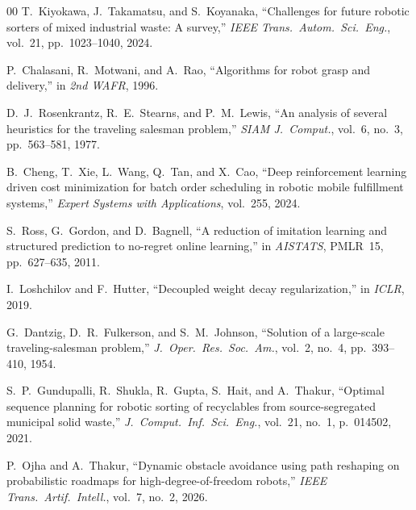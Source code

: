 \documentclass[conference]{IEEEtran}
\begin{document}
\begin{thebibliography}{00}
 T.~Kiyokawa, J.~Takamatsu, and S.~Koyanaka, ``Challenges for future robotic sorters of mixed industrial waste: A survey,'' \emph{IEEE Trans.\ Autom.\ Sci.\ Eng.}, vol.~21, pp.~1023--1040, 2024.

 P.~Chalasani, R.~Motwani, and A.~Rao, ``Algorithms for robot grasp and delivery,'' in \emph{2nd WAFR}, 1996.

 D.~J.~Rosenkrantz, R.~E.~Stearns, and P.~M.~Lewis, ``An analysis of several heuristics for the traveling salesman problem,'' \emph{SIAM J.\ Comput.}, vol.~6, no.~3, pp.~563--581, 1977.

 B.~Cheng, T.~Xie, L.~Wang, Q.~Tan, and X.~Cao, ``Deep reinforcement learning driven cost minimization for batch order scheduling in robotic mobile fulfillment systems,'' \emph{Expert Systems with Applications}, vol.~255, 2024.

 S.~Ross, G.~Gordon, and D.~Bagnell, ``A reduction of imitation learning and structured prediction to no-regret online learning,'' in \emph{AISTATS}, PMLR~15, pp.~627--635, 2011.

 I.~Loshchilov and F.~Hutter, ``Decoupled weight decay regularization,'' in \emph{ICLR}, 2019.

 G.~Dantzig, D.~R.~Fulkerson, and S.~M.~Johnson, ``Solution of a large-scale traveling-salesman problem,'' \emph{J.\ Oper.\ Res.\ Soc.\ Am.}, vol.~2, no.~4, pp.~393--410, 1954.

 S.~P.~Gundupalli, R.~Shukla, R.~Gupta, S.~Hait, and A.~Thakur, ``Optimal sequence planning for robotic sorting of recyclables from source-segregated municipal solid waste,'' \emph{J.\ Comput.\ Inf.\ Sci.\ Eng.}, vol.~21, no.~1, p.~014502, 2021.

 P.~Ojha and A.~Thakur, ``Dynamic obstacle avoidance using path reshaping on probabilistic roadmaps for high-degree-of-freedom robots,'' \emph{IEEE Trans.\ Artif.\ Intell.}, vol.~7, no.~2, 2026.

\end{thebibliography}
\end{document}
